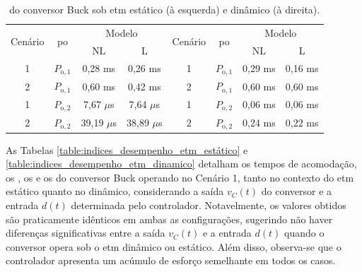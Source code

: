 \vspace{12pt}
\begin{table}[H]
  \centering
  \captionsetup{justification=centering}
  \setlength{\tabcolsep}{10pt}
  \begin{tabular}{cccccccc}
    \toprule
    \multirow{2}{*}{\centering Cenário} & \multirow{2}{*}{\centering \acrshort{po}} & \multicolumn{2}{c}{\centering Modelo} & \multirow{2}{*}{\centering Cenário} & \multirow{2}{*}{\centering \acrshort{po}} & \multicolumn{2}{c}{\centering Modelo}                     \\
    \cmidrule(lr){3-4} \cmidrule(lr){7-8}                      &                                           & NL                                    & L                                   &                                           &                                       & NL      & L       \\
    \midrule
    1                                   & $P_{\mathrm{o}, 1}$                       & 0,28 ms                               & 0,26 ms                             & 1                                         & $P_{\mathrm{o}, 1}$                   & 0,29 ms & 0,16 ms \\
    2                                   & $P_{\mathrm{o}, 1}$                       & 0,60 ms                               & 0,42 ms                             & 2                                         & $P_{\mathrm{o}, 1}$                   & 0,60 ms & 0,60 ms \\
    1                                   & $P_{\mathrm{o}, 2}$                       & 7,67 $\mu$s                           & 7,64 $\mu$s                         & 1                                         & $P_{\mathrm{o}, 2}$                   & 0,06 ms & 0,06 ms \\
    2                                   & $P_{\mathrm{o}, 2}$                       & 39,19 $\mu$s                          & 38,89 $\mu$s                        & 2                                         & $P_{\mathrm{o}, 2}$                   & 0,24 ms & 0,22 ms \\
    \bottomrule
  \end{tabular}
  \caption{ do conversor Buck sob \acrshort{etm} estático (à esquerda) e dinâmico (à direita).}
  \label{table:imees_buck_static_dynamic}
\end{table}

As Tabelas \ref{table:indices_desempenho_etm_estático} e \ref{table:indices_desempenho_etm_dinamico} detalham os tempos de acomodação, os , os  e os  do conversor Buck operando no Cenário 1, tanto no contexto do \acrshort{etm} estático quanto no dinâmico, considerando a saída $v_C(t)$ do conversor e a entrada $d(t)$ determinada pelo controlador. Notavelmente, os valores obtidos são praticamente idênticos em ambas as configurações, sugerindo não haver diferenças significativas entre a saída $v_C(t)$ e a entrada $d(t)$ quando o conversor opera sob o \acrshort{etm} dinâmico ou estático. Além disso, observa-se que o controlador apresenta um acúmulo de esforço semelhante em todos os casos. 

